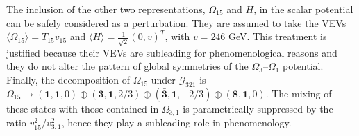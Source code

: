 The inclusion of the other two representations, $\Omega_{15}$ and $H$, in the scalar potential can be safely considered as a perturbation. They are assumed to take the VEVs $\langle \Omega_{15} \rangle = T_{15} v_{15}$ and $\langle H \rangle = \tfrac{1}{\sqrt{2}} (0, v)^T$, with $v = 246$ GeV. This treatment is justified because their VEVs are subleading for phenomenological reasons and they do not alter the pattern of global symmetries of the $\Omega_3$--$\Omega_1$ potential.
Finally, the decomposition of $\Omega_{15}$ under $\mathcal{G}_{321}$ is $\Omega_{15} \to (\mathbf{1},\mathbf{1},0) \oplus (\mathbf{3},\mathbf{1},2/3) \oplus (\mathbf{\bar 3},\mathbf{1},-2/3) \oplus (\mathbf{8}, \mathbf{1}, 0)$. The mixing of these states with those contained in $\Omega_{3,1}$ is parametrically suppressed by the ratio $v^2_{15} / v^2_{3,1}$, hence they play a subleading role in phenomenology.


